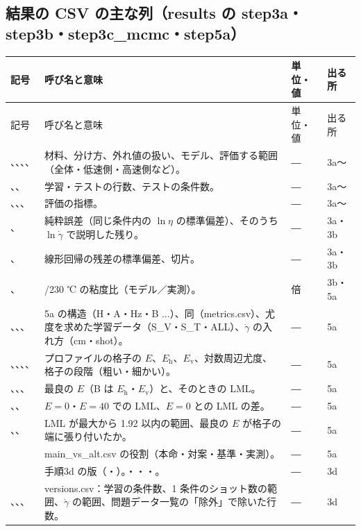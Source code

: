 \documentclass[paper=a4paper,fontsize=10.5pt,line_length=44zw,number_of_lines=38]{jlreq}
\makeatletter
\newcommand{\file}[1]{\texttt{\detokenize{#1}}}
\newcommand{\gd}{\dot{\gamma}}
\newcommand{\Eh}{E_{\mathrm{h}}}
\newcommand{\Ev}{E_{\mathrm{v}}}
\newenvironment{symtab}{%
  \begin{longtable}{@{}>{\raggedright\arraybackslash}p{6.5\zw}>{\raggedright\arraybackslash}p{22\zw}>{\raggedright\arraybackslash}p{6\zw}>{\raggedright\arraybackslash}p{4.5\zw}@{}}
  \toprule 記号 & 呼び名と意味 & 単位・値 & 出る所 \\ \midrule \endfirsthead
  \toprule 記号 & 呼び名と意味 & 単位・値 & 出る所 \\ \midrule \endhead
  \bottomrule \endlastfoot}{\end{longtable}}
\makeatother
\begin{document}
\subsection{結果の CSV の主な列（results の step3a・step3b・step3c\_mcmc・step5a）}
\begin{symtab}
\file{material}、\file{split}、\file{data}、\file{model}、\file{subset} & 材料、分け方、外れ値の扱い、モデル、評価する範囲（全体・低速側・高速側など）。 & ― & 3a〜 \\
\file{n_train}、\file{n_test}、\file{n_cond_test} & 学習・テストの行数、テストの条件数。 & ― & 3a〜 \\
\file{R2}、\file{RMSE}、\file{coverage95}、\file{NLPD} & 評価の指標。 & ― & 3a〜 \\
\file{pure_sd_ln_eta}、\file{pure_sd_after_gd} & 純粋誤差（同じ条件内の $\ln\eta$ の標準偏差）、そのうち $\ln\gd$ で説明した残り。 & ― & 3a・3b \\
\file{resid_sd}、\file{intercept} & 線形回帰の残差の標準偏差、切片。 & ― & 3a・3b \\
\file{ratio_190_230}、\file{observed} & 190/230 ℃ の粘度比（モデル／実測）。 & 倍 & 3b・5a \\
\file{structure}、\file{variant}、\file{set}、\file{mode} & 5a の構造（H・A・Hz・B ...）、同（metrics.csv）、尤度を求めた学習データ（S\_V・S\_T・ALL）、$\gd$ の入れ方（cm・shot）。 & ― & 5a \\
\file{E}、\file{Eh}、\file{Ev}、\file{LML}、\file{stage} & プロファイルの格子の $E$、$\Eh$、$\Ev$、対数周辺尤度、格子の段階（粗い・細かい）。 & ― & 5a \\
\file{E_best}、\file{Eh_best}、\file{Ev_best}、\file{LML_best} & 最良の $E$（B は $\Eh$・$\Ev$）と、そのときの LML。 & ― & 5a \\
\file{LML_at_E0}、\file{LML_at_E40}、\file{dLML_vs_E0} & $E=0$・$E=40$ での LML、$E=0$ との LML の差。 & ― & 5a \\
\file{E_95_lo}、\file{E_95_hi}、\file{at_grid_edge} & LML が最大から 1.92 以内の範囲、最良の $E$ が格子の端に張り付いたか。 & ― & 5a \\
\file{role} & main\_vs\_alt.csv の役割（本命・対案・基準・実測）。 & ― & 5a \\
\file{version} & 手順3d の版（\file{5data}・\file{Alldata}）。\file{versions.csv}・\file{metrics.csv}・\file{kernels.csv}・\file{summary.csv}。 & ― & 3d \\
\file{n_cond_train}、\file{shots_per_cond}、\file{gd_range}、\file{removed_by_list} & versions.csv：学習の条件数、1 条件のショット数の範囲、$\gd$ の範囲、問題データ一覧の「除外」で除いた行数。 & ― & 3d \\

\end{symtab}
\end{document}
